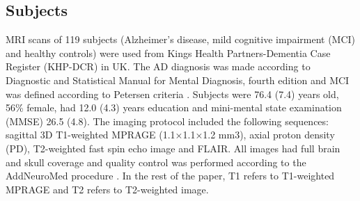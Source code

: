 \subsection{Subjects}
MRI scans of 119 subjects (Alzheimer’s disease, mild cognitive impairment (MCI) and healthy controls) were used from Kings Health Partners-Dementia Case Register (KHP-DCR) in UK. The AD diagnosis was made according to Diagnostic and Statistical Manual for Mental Diagnosis, fourth edition and MCI was defined according to Petersen criteria \cite{10190820}. Subjects were 76.4 (7.4) years old, 56\% female, had 12.0 (4.3) years education and mini-mental state examination (MMSE) 26.5 (4.8). 
The imaging protocol included the following sequences: sagittal 3D T1-weighted MPRAGE (1.1×1.1×1.2 mm3), axial proton density (PD), T2-weighted fast spin echo image and FLAIR. All images had full brain and skull coverage and quality control was performed according to the AddNeuroMed procedure \cite{21157852}. In the rest of the paper, T1 refers to T1-weighted MPRAGE and T2 refers to T2-weighted image.

    
    
    